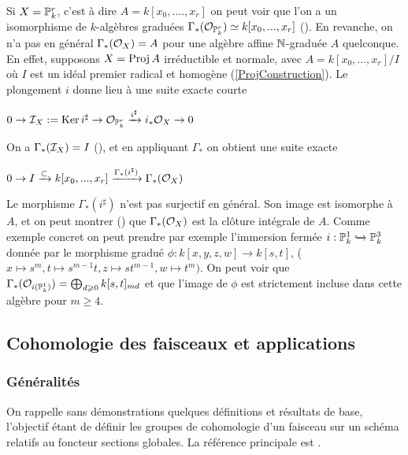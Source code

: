 \begin{rem}
Si $X=\mathbb{P}_k^r$, c'est à dire $A=k[x_0,....,x_r]$ on peut voir que l'on a un isomorphisme de $k$-algèbres graduées $\Gamma_*(\mathcal{O}_{\mathbb{P}_k^r})\simeq k[x_0,...,x_r]$ (\cite[II.5.13]{Hartshorne}). En revanche, on n'a pas en général $\Gamma_*(\mathcal{O}_X)=A$ pour une algèbre affine $\mathbb{N}$-graduée $A$ quelconque. En effet, supposons $X=\operatorname{Proj} A$ irréductible et normale, avec $A=k[x_0,...,x_r]/I$ où $I$ est un idéal premier radical et homogène (\ref{ProjConstruction}). Le plongement $i$ donne lieu à une suite exacte courte
\begin{center}
$0\rightarrow\mathcal{I}_X:=\operatorname{Ker} i^\sharp\rightarrow\mathcal{O}_{\mathbb{P}_k^r}\xrightarrow{i^\sharp}i_*\mathcal{O}_X\rightarrow 0$
\end{center}
On a $\Gamma_*(\mathcal{I}_X)=I$ (\cite[ex II.5.10]{Hartshorne}), et en appliquant $\Gamma_*$ on obtient une suite exacte
\begin{center}
$0\rightarrow I \xrightarrow{\subset} k[x_0,...,x_r]\xrightarrow{\Gamma_*(i^\sharp)}\Gamma_*(\mathcal{O}_X)$
\end{center}

Le morphisme $\Gamma_*(i^\sharp)$ n'est pas surjectif en général. Son image est isomorphe à $A$, et on peut montrer (\cite[II ex 5.14]{Hartshorne}) que $\Gamma_*(\mathcal{O}_X)$ est la clôture intégrale de $A$. Comme exemple concret on peut prendre par exemple l'immersion fermée $i:\mathbb{P}_k^1\xhookrightarrow{}\mathbb{P}_k^3$ donnée par le morphisme gradué $\phi:k[x,y,z,w]\rightarrow k[s,t]$, ($x\mapsto s^m, t\mapsto s^{m-1}t, z\mapsto st^{m-1},w\mapsto t^m)$. On peut voir que $\Gamma_*(\mathcal{O}_{i(\mathbb{P}_k^1)})=\bigoplus_{d\geqslant 0}k[s,t]_{md}$ et que l'image de $\phi$ est strictement incluse dans cette algèbre pour $m\geq 4$.

\end{rem}

\subsection{Cohomologie des faisceaux et applications}

\subsubsection{Généralités}

On rappelle sans démonstrations quelques définitions et résultats de base, l'objectif étant de définir les groupes de cohomologie d'un faisceau sur un schéma relatifs au foncteur sections globales. La référence principale est \cite[chap III]{Hartshorne}.\\

